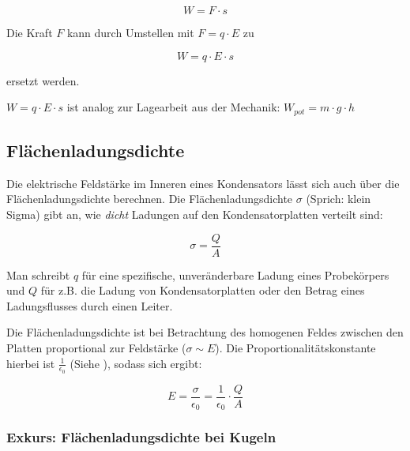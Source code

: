 \begin{equation} \label{eq:arbeit}
	W = F \cdot s
\end{equation}

\noindent Die Kraft $F$ kann durch Umstellen mit $F = q \cdot E$ zu

\begin{equation} \label{eq:arbeit_kondensator}
	W = q \cdot E \cdot s
\end{equation}

\noindent ersetzt werden.

\begin{NiceToKnow}
$W = q \cdot E \cdot s$ ist analog zur Lagearbeit aus der Mechanik: $W_{pot} = m \cdot g \cdot h$
\end{NiceToKnow}


\subsection{Flächenladungsdichte}

Die elektrische Feldstärke im Inneren eines Kondensators lässt sich auch über die Flächenladungsdichte berechnen. Die Flächenladungsdichte $\sigma$ (Sprich: \glqq klein Sigma\grqq ) gibt an, wie \emph{dicht} Ladungen auf den Kondensatorplatten verteilt sind:

\begin{equation} \label{eq:flaechenladungsdichte}
	\sigma = \frac{Q}{A}
\end{equation}

\begin{NiceToKnow}
Man schreibt $q$ für eine spezifische, unveränderbare Ladung eines Probekörpers und $Q$ für z.B. die Ladung von Kondensatorplatten oder den Betrag eines Ladungsflusses durch einen Leiter.
\end{NiceToKnow}

Die Flächenladungsdichte ist bei Betrachtung des homogenen Feldes zwischen den Platten proportional zur Feldstärke ($\sigma \sim E$). Die Proportionalitätskonstante hierbei ist $\frac{1}{\epsilon_0}$ (Siehe ), sodass sich ergibt:

\begin{equation} \label{eq:feldstaerke_mit_sigma}
	E = \frac{\sigma}{\epsilon_0} = \frac{1}{\epsilon_0} \cdot \frac{Q}{A}
\end{equation}

\subsubsection{Exkurs: Flächenladungsdichte bei Kugeln}

